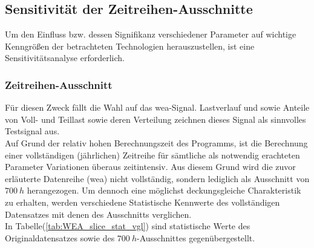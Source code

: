 \documentclass[onecolumn,10pt,titlepage]{article}
\begin{document}
\subsection{Sensitivität der Zeitreihen-Ausschnitte} %
Um den Einfluss bzw. dessen Signifikanz verschiedener Parameter auf wichtige Kenngrößen der betrachteten Technologien herauszustellen, ist eine Sensitivitätsanalyse erforderlich.\\
\subsubsection{Zeitreihen-Ausschnitt}
Für diesen Zweck fällt die Wahl auf das \gls{wea}-Signal. Lastverlauf und sowie Anteile von Voll- und Teillast sowie deren Verteilung zeichnen dieses Signal als sinnvolles Testsignal aus.\\ 
Auf Grund der relativ hohen Berechnungszeit des Programms, ist die Berechnung einer vollständigen (jährlichen) Zeitreihe für sämtliche als notwendig erachteten Parameter Variationen überaus zeitintensiv. Aus diesem Grund wird die zuvor erläuterte Datenreihe (\gls{wea}) nicht vollständig, sondern lediglich als Ausschnitt von $700~h$ herangezogen. Um dennoch eine möglichst deckungsgleiche Charakteristik zu erhalten, werden verschiedene Statistische Kennwerte des vollständigen Datensatzes mit denen des Ausschnitts verglichen.\\
In Tabelle(\ref{tab:WEA_slice_stat_vgl}) sind statistische Werte des Originaldatensatzes sowie des $700~h$-Ausschnittes gegenübergestellt. 
\end{document}

